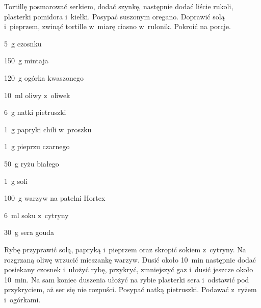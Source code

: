 \documentclass[../main.tex]{subfiles}
\begin{document}
Tortillę posmarować serkiem, dodać szynkę, następnie dodać liście rukoli,
plasterki pomidora i~kiełki. Posypać suszonym oregano. Doprawić solą
i~pieprzem, zwinąć tortille w~miarę ciasno w~rulonik. Pokroić na porcje.


\begin{Ingred}
    \item \qty{5}{\gram} czosnku
    \item \qty{150}{\gram} mintaja
    \item \qty{120}{\gram} ogórka kwaszonego
    \item \qty{10}{\milli\litre} oliwy z~oliwek
    \item \qty{6}{\gram} natki pietruszki
    \item \qty{1}{\gram} papryki chili w~proszku
    \item \qty{1}{\gram} pieprzu czarnego
    \item \qty{50}{\gram} ryżu białego
    \item \qty{1}{\gram} soli
    \item \qty{100}{\gram} warzyw na patelni Hortex
    \item \qty{6}{\milli\litre} soku z~cytryny
    \item \qty{30}{\gram} sera gouda
\end{Ingred}

Rybę przyprawić solą, papryką i~pieprzem oraz skropić sokiem z~cytryny. Na
rozgrzaną oliwę wrzucić mieszankę warzyw. Dusić około \qty{10}{\minute}
następnie dodać posiekany czosnek i~ułożyć rybę, przykryć, zmniejszyć gaz
i~dusić jeszcze około \qty{10}{\minute}. Na sam koniec duszenia ułożyć na rybie
plasterki sera i~odstawić pod przykryciem, aż ser się nie rozpuści. Posypać
natką pietruszki. Podawać z~ryżem i~ogórkami.

\end{document}
